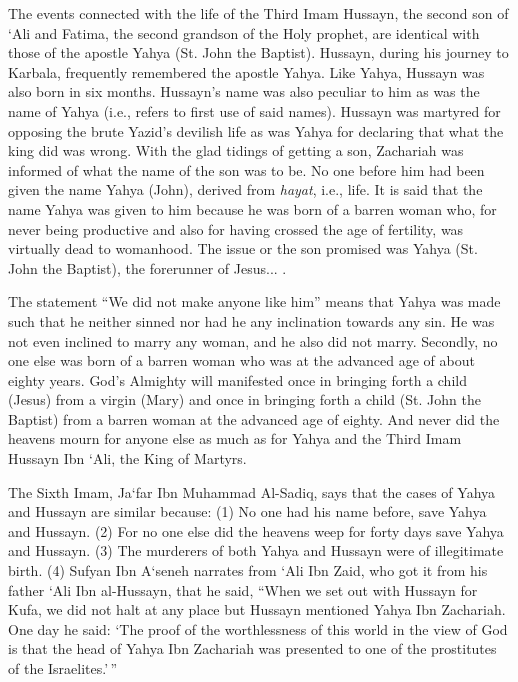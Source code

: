 \begin{quotationx}
The events connected with the life of the Third Imam Hussayn, the second son of `Ali and Fatima, the second grandson of the Holy prophet, are identical with those of the apostle Yahya (St. John the Baptist). Hussayn, during his journey to Karbala, frequently remembered the apostle Yahya. Like Yahya, Hussayn was also born in six months. Hussayn's name was also peculiar to him as was the name of Yahya (i.e., refers to first use of said names). Hussayn was martyred for opposing the brute Yazid's devilish life as was Yahya for declaring that what the king did was wrong. With the glad tidings of getting a son, Zachariah was informed of what the name of the son was to be. No one before him had been given the name Yahya (John), derived from \emph{hayat}, i.e., life. It is said that the name Yahya was given to him because he was born of a barren woman who, for never being productive and also for having crossed the age of fertility, was virtually dead to womanhood. The issue or the son promised was Yahya (St. John the Baptist), the forerunner of Jesus... .

The statement ``We did not make anyone like him'' means that Yahya was made such that he neither sinned nor had he any inclination towards any sin. He was not even inclined to marry any woman, and he also did not marry. Secondly, no one else was born of a barren woman who was at the advanced age of about eighty years. God's Almighty will manifested once in bringing forth a child (Jesus) from a virgin (Mary) and once in bringing forth a child (St. John the Baptist) from a barren woman at the advanced age of eighty. And never did the heavens mourn for anyone else as much as for Yahya and the Third Imam Hussayn Ibn `Ali, the King of Martyrs.

The Sixth Imam, Ja`far Ibn Muhammad Al-Sadiq, says that the cases of Yahya and Hussayn are similar because: (1) No one had his name before, save Yahya and Hussayn. (2) For no one else did the heavens weep for forty days save Yahya and Hussayn. (3) The murderers of both Yahya and Hussayn were of illegitimate birth. (4) Sufyan Ibn A`seneh narrates from `Ali Ibn Zaid, who got it from his father `Ali Ibn al-Hussayn, that he said, ``When we set out with Hussayn for Kufa, we did not halt at any place but Hussayn mentioned Yahya Ibn Zachariah. One day he said: `The proof of the worthlessness of this world in the view of God is that the head of Yahya Ibn Zachariah was presented to one of the prostitutes of the Israelites.'\,''
\end{quotationx}



